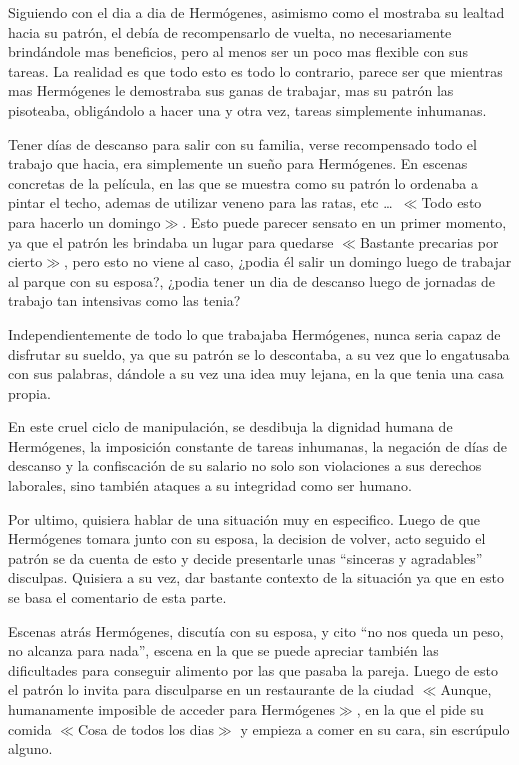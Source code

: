 \documentclass[letterpaper, 12pt]{article}
\renewcommand{\comment}[1]{{\small $\ll$#1$\gg$}}
\begin{document}
Siguiendo con el dia a dia de Hermógenes, asimismo como el
mostraba su lealtad hacia su patrón, el debía de
recompensarlo de vuelta, no necesariamente brindándole mas
beneficios, pero al menos ser un poco mas flexible con sus
tareas. La realidad es que todo esto es todo lo contrario,
parece ser que mientras mas Hermógenes le demostraba sus
ganas de trabajar, mas su patrón las pisoteaba, obligándolo
a hacer una y otra vez, tareas simplemente inhumanas.

Tener días de descanso para salir con su familia, verse
recompensado todo el trabajo que hacia, era simplemente un
sueño para Hermógenes. En escenas concretas de la película,
en las que se muestra como su patrón lo ordenaba a pintar
el techo, ademas de utilizar veneno para las ratas, etc
\dots{}~\comment{Todo esto para hacerlo un domingo}. Esto
puede parecer sensato en un primer momento, ya que el
patrón les brindaba un lugar para quedarse
\comment{Bastante precarias por cierto}, pero esto no viene
al caso, ¿podia él salir un domingo luego de trabajar al
parque con su esposa?, ¿podia tener un dia de descanso
luego de jornadas de trabajo tan intensivas como las tenia?

Independientemente de todo lo que trabajaba Hermógenes,
nunca seria capaz de disfrutar su sueldo, ya que su patrón
se lo descontaba, a su vez que lo engatusaba con sus
palabras, dándole a su vez una idea muy lejana, en la que
tenia una casa propia.

En este cruel ciclo de manipulación, se desdibuja la
dignidad humana de Hermógenes, la imposición constante de
tareas inhumanas, la negación de días de descanso y la
confiscación de su salario no solo son violaciones a sus
derechos laborales, sino también ataques a su integridad
como ser humano.

Por ultimo, quisiera hablar de una situación muy en
especifico. Luego de que Hermógenes tomara junto con su
esposa, la decision de volver, acto seguido el patrón se da
cuenta de esto y decide presentarle unas ``sinceras y
agradables'' disculpas. Quisiera a su vez, dar bastante
contexto de la situación ya que en esto se basa el
comentario de esta parte.

Escenas atrás Hermógenes, discutía con su esposa, y cito
``no nos queda un peso, no alcanza para nada'', escena en
la que se puede apreciar también las dificultades para
conseguir alimento por las que pasaba la pareja. Luego de
esto el patrón lo invita para disculparse en un restaurante
de la ciudad \comment{Aunque, humanamente imposible de
acceder para Hermógenes}, en la que el pide su comida
\comment{Cosa de todos los dias} y empieza a comer en su
cara, sin escrúpulo alguno.
\end{document}
